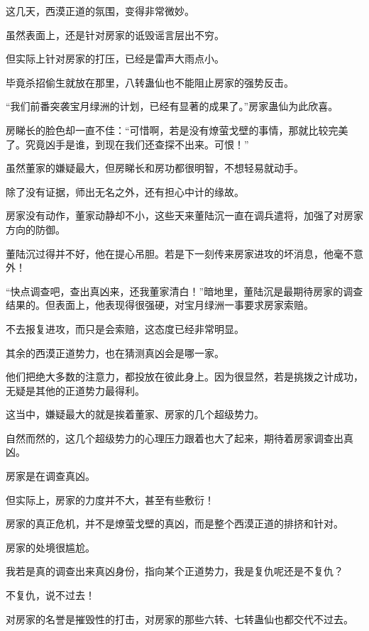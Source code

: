 
\begin{this_body}



这几天，西漠正道的氛围，变得非常微妙。

虽然表面上，还是针对房家的诋毁谣言层出不穷。

但实际上针对房家的打压，已经是雷声大雨点小。

毕竟杀招偷生就放在那里，八转蛊仙也不能阻止房家的强势反击。

“我们前番突袭宝月绿洲的计划，已经有显著的成果了。”房家蛊仙为此欣喜。

房睇长的脸色却一直不佳：“可惜啊，若是没有燎萤戈壁的事情，那就比较完美了。究竟凶手是谁，到现在我们还查探不出来。可恨！”

虽然董家的嫌疑最大，但房睇长和房功都很明智，不想轻易就动手。

除了没有证据，师出无名之外，还有担心中计的缘故。

房家没有动作，董家动静却不小，这些天来董陆沉一直在调兵遣将，加强了对房家方向的防御。

董陆沉过得并不好，他在提心吊胆。若是下一刻传来房家进攻的坏消息，他毫不意外！

“快点调查吧，查出真凶来，还我董家清白！”暗地里，董陆沉是最期待房家的调查结果的。但表面上，他表现得很强硬，对宝月绿洲一事要求房家索赔。

不去报复进攻，而只是会索赔，这态度已经非常明显。

其余的西漠正道势力，也在猜测真凶会是哪一家。

他们把绝大多数的注意力，都投放在彼此身上。因为很显然，若是挑拨之计成功，无疑是其他的正道势力最得利。

这当中，嫌疑最大的就是挨着董家、房家的几个超级势力。

自然而然的，这几个超级势力的心理压力跟着也大了起来，期待着房家调查出真凶。

房家是在调查真凶。

但实际上，房家的力度并不大，甚至有些敷衍！

房家的真正危机，并不是燎萤戈壁的真凶，而是整个西漠正道的排挤和针对。

房家的处境很尴尬。

我若是真的调查出来真凶身份，指向某个正道势力，我是复仇呢还是不复仇？

不复仇，说不过去！

对房家的名誉是摧毁性的打击，对房家的那些六转、七转蛊仙也都交代不过去。


\end{this_body}
